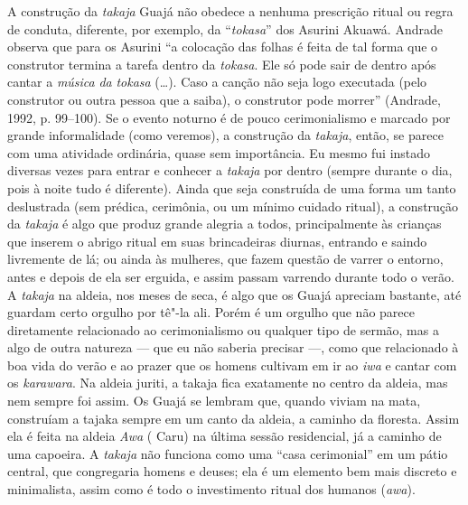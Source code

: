 A construção da \emph{takaja} Guajá não obedece a nenhuma prescrição
ritual ou regra de conduta, diferente, por exemplo, da ``\emph{tokasa}''
dos Asurini Akuawá. Andrade observa que para os Asurini ``a colocação das
folhas é feita de tal forma que o construtor termina a tarefa dentro da
\emph{tokasa}. Ele só pode sair de dentro após cantar a \emph{música}
\emph{da} \emph{tokasa} (\ldots{}). Caso a canção não seja logo executada
(pelo construtor ou outra pessoa que a saiba), o construtor pode morrer''
(Andrade, 1992, p. 99--100). Se o evento noturno é de pouco
cerimonialismo e marcado por grande informalidade (como veremos), a
construção da \emph{takaja}, então, se parece com uma atividade
ordinária, quase sem importância. Eu mesmo fui instado diversas vezes
para entrar e conhecer a \emph{takaja} por dentro (sempre durante o dia,
pois à noite tudo é diferente). Ainda que seja construída de uma forma
um tanto deslustrada (sem prédica, cerimônia, ou um mínimo cuidado
ritual), a construção da \emph{takaja} é algo que produz grande alegria
a todos, principalmente às crianças que inserem o abrigo ritual em suas
brincadeiras diurnas, entrando e saindo livremente de lá; ou ainda às
mulheres, que fazem questão de varrer o entorno, antes e depois de ela
ser erguida, e assim passam varrendo durante todo o verão. A
\emph{takaja} na aldeia, nos meses de seca, é algo que os Guajá apreciam
bastante, até guardam certo orgulho por tê"-la ali. Porém é um orgulho
que não parece diretamente relacionado ao cerimonialismo ou qualquer
tipo de sermão, mas a algo de outra natureza --- que eu não saberia
precisar ---, como que relacionado à boa vida do verão e ao prazer que os
homens cultivam em ir ao \emph{iwa} e cantar com os \emph{karawara}. Na
aldeia juriti, a takaja fica exatamente no centro da aldeia, mas nem
sempre foi assim. Os Guajá se lembram que, quando viviam na mata,
construíam a tajaka sempre em um canto da aldeia, a caminho da floresta.
Assim ela é feita na aldeia \emph{Awa} ( Caru) na última sessão
residencial, já a caminho de uma capoeira. A \emph{takaja} não funciona
como uma ``casa cerimonial'' em um pátio central, que congregaria homens
e deuses; ela é um elemento bem mais discreto e minimalista, assim como
é todo o investimento ritual dos humanos (\emph{awa}).

